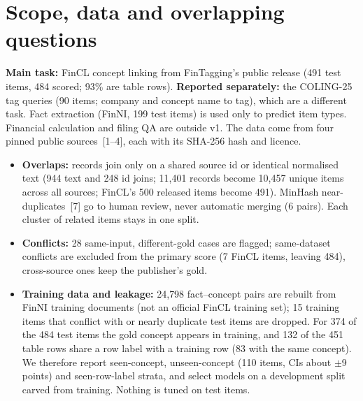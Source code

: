 \documentclass[10pt]{article}
\begin{document}
\section{Scope, data and overlapping questions}
\textbf{Main task:} FinCL concept linking from FinTagging's public release (491 test items, 484 scored; 93\% are table
rows). \textbf{Reported separately:} the COLING-25 tag queries (90 items; company and concept name to tag), which are a
different task. Fact extraction (FinNI, 199 test items) is used only to predict item types. Financial calculation and
filing QA are outside v1. The data come from four pinned public sources~[1--4], each with its SHA-256 hash and licence.
\begin{itemize}
\item \textbf{Overlaps:} records join only on a shared source id or identical normalised text (944 text and 248 id
joins; 11{,}401 records become 10{,}457 unique items across all sources; FinCL's 500 released items become 491).
MinHash near-duplicates~[7] go to human review, never automatic
merging (6 pairs). Each cluster of related items stays in one split.
\item \textbf{Conflicts:} 28 same-input, different-gold cases are flagged; same-dataset conflicts are excluded from the
primary score (7 FinCL items, leaving 484), cross-source ones keep the publisher's gold.
\item \textbf{Training data and leakage:} 24{,}798 fact--concept pairs are rebuilt from FinNI training documents (not an
official FinCL training set); 15 training items that conflict with or nearly duplicate test items are dropped. For 374
of the 484 test items the gold concept appears in training, and 132 of the 451 table rows share a row label with a
training row (83 with the same concept). We therefore report seen-concept, unseen-concept (110 items, CIs about
$\pm$9 points) and seen-row-label strata, and select models on a development split carved from training. Nothing is
tuned on test items.
\end{itemize}
\end{document}
